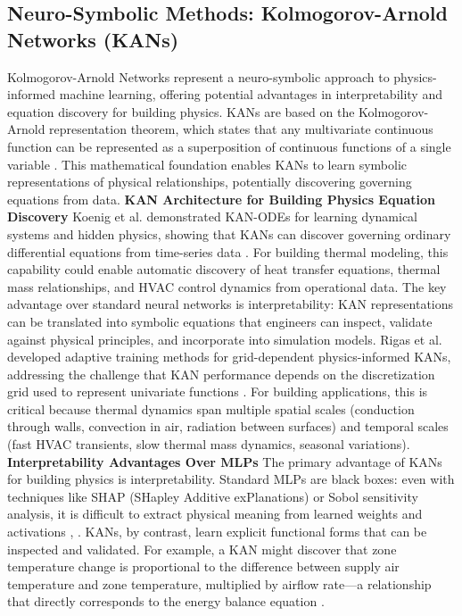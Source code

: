 \documentclass[12pt,a4paper]{article}
\begin{document}
\subsection{Neuro-Symbolic Methods: Kolmogorov-Arnold Networks (KANs)}
Kolmogorov-Arnold Networks represent a neuro-symbolic approach to physics-informed machine learning, offering potential advantages in interpretability and equation discovery for building physics. KANs are based on the Kolmogorov-Arnold representation theorem, which states that any multivariate continuous function can be represented as a superposition of continuous functions of a single variable \cite{ref40}. This mathematical foundation enables KANs to learn symbolic representations of physical relationships, potentially discovering governing equations from data.
\textbf{KAN Architecture for Building Physics Equation Discovery}
Koenig et al. demonstrated KAN-ODEs for learning dynamical systems and hidden physics, showing that KANs can discover governing ordinary differential equations from time-series data \cite{ref40}. For building thermal modeling, this capability could enable automatic discovery of heat transfer equations, thermal mass relationships, and HVAC control dynamics from operational data. The key advantage over standard neural networks is interpretability: KAN representations can be translated into symbolic equations that engineers can inspect, validate against physical principles, and incorporate into simulation models.
Rigas et al. developed adaptive training methods for grid-dependent physics-informed KANs, addressing the challenge that KAN performance depends on the discretization grid used to represent univariate functions \cite{ref41}. For building applications, this is critical because thermal dynamics span multiple spatial scales (conduction through walls, convection in air, radiation between surfaces) and temporal scales (fast HVAC transients, slow thermal mass dynamics, seasonal variations).
\textbf{Interpretability Advantages Over MLPs}
The primary advantage of KANs for building physics is interpretability. Standard MLPs are black boxes: even with techniques like SHAP (SHapley Additive exPlanations) or Sobol sensitivity analysis, it is difficult to extract physical meaning from learned weights and activations \cite{ref26}, \cite{ref57}. KANs, by contrast, learn explicit functional forms that can be inspected and validated. For example, a KAN might discover that zone temperature change is proportional to the difference between supply air temperature and zone temperature, multiplied by airflow rate---a relationship that directly corresponds to the energy balance equation \cite{ref179}.
\end{document}
